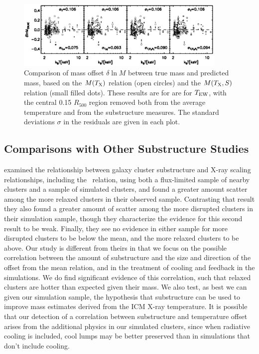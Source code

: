 \documentclass{aastex} \usepackage{natbib}
\begin{document}
\begin{figure}[b]
  \centering
  \includegraphics[width=0.9\textwidth]{f9.eps}
  \caption{Comparison of mass offset $\delta \ln M$ between true mass
    and predicted mass, based on the $M(T_{\rm X})$ relation (open circles)
    and the $M(T_{\rm X},S)$ relation (small filled dots).  These results
    are for are for $T_{\rm EW}$, with the central 0.15 $R_{500}$ region
    removed both from the average temperature and from the
    substructure measures.  The standard deviations $\sigma$ in the
    residuals are given in each plot.}
  \label{fig:resid3}
\end{figure}

\subsection{Comparisons with Other Substructure Studies}

\cite{2006ApJ...639...64O} examined the relationship between galaxy
cluster substructure and X-ray scaling relationships, including the
\mtx\ relation, using both a flux-limited sample of nearby clusters
and a sample of simulated clusters, and found a greater amount scatter
among the more relaxed clusters in their observed sample.  Contrasting
that result they also found a greater amount of scatter among the more
disrupted clusters in their simulation sample, though they
characterize the evidence for this second result to be weak.  Finally,
they see no evidence in either sample for more disrupted clusters to
be below the mean, and the more relaxed clusters to be above.  Our
study is different from theirs in that we focus on the possible
correlation between the amount of substructure and the size and
direction of the offset from the mean relation, and in the treatment
of cooling and feedback in the simulations.  We do find significant
evidence of this correlation, such that relaxed clusters are hotter
than expected given their mass.  We also test, as best we can given
our simulation sample, the hypothesis that substructure can be used to
improve mass estimates derived from the ICM X-ray temperature.  It is
possible that our detection of a correlation between substructure and
temperature offset arises from the additional physics in our simulated
clusters, since when radiative cooling is included, cool lumps may be
better preserved than in simulations that don't include cooling.
\end{document}
